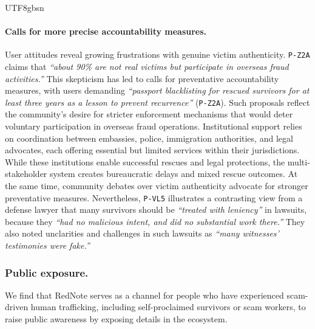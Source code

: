 \documentclass[sigconf,nonacm]{acmart}
\begin{document}
\begin{CJK}{UTF8}{gbsn}
\paragraph{\textbf{Calls for more precise accountability measures.}}
User attitudes reveal growing frustrations with genuine victim authenticity. \texttt{P-Z2A} claims that \textit{``about 90\% are not real victims but participate in overseas fraud activities.''} This skepticism has led to calls for preventative accountability measures, with users demanding \textit{``passport blacklisting for rescued survivors for at least three years as a lesson to prevent recurrence''} (\texttt{P-Z2A}). Such proposals reflect the community's desire for stricter enforcement mechanisms that would deter voluntary participation in overseas fraud operations. Institutional support relies on coordination between embassies, police, immigration authorities, and legal advocates, each offering essential but limited services within their jurisdictions. While these institutions enable successful rescues and legal protections, the multi-stakeholder system creates bureaucratic delays and mixed rescue outcomes. At the same time, community debates over victim authenticity advocate for stronger preventative measures. Nevertheless, \texttt{P-VL5} illustrates a contrasting view from a defense lawyer that many survivors should be \textit{``treated with leniency''} in lawsuits, because they \textit{``had no malicious intent, and did no substantial work there.''} They also noted unclarities and challenges in such lawsuits as \textit{``many witnesses' testimonies were fake.''}

\subsubsection{Public exposure.}
\label{sec:public_exposure}

We find that RedNote serves as a channel for people who have experienced scam-driven human trafficking, including self-proclaimed survivors or scam workers, to raise public awareness by exposing details in the ecosystem.


\end{CJK}
\end{document}
